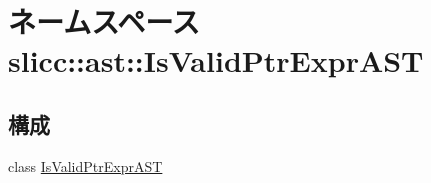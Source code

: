 \hypertarget{namespaceslicc_1_1ast_1_1IsValidPtrExprAST}{
\section{ネームスペース slicc::ast::IsValidPtrExprAST}
\label{namespaceslicc_1_1ast_1_1IsValidPtrExprAST}
}
\subsection*{構成}
\begin{DoxyCompactItemize}
\item 
class \hyperlink{classslicc_1_1ast_1_1IsValidPtrExprAST_1_1IsValidPtrExprAST}{IsValidPtrExprAST}
\end{DoxyCompactItemize}
